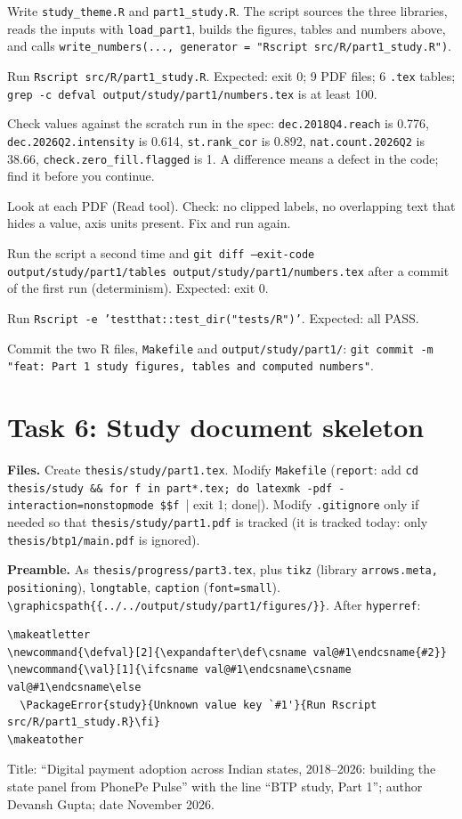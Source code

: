\documentclass[10pt,a4paper]{article}
\newcommand{\f}[1]{\texttt{#1}}
\begin{document}
\begin{steps}
\item Write \f{study\_theme.R} and \f{part1\_study.R}. The script sources the three libraries, reads the
      inputs with \f{load\_part1}, builds the figures, tables and numbers above, and calls
      \f{write\_numbers(..., generator = "Rscript src/R/part1\_study.R")}.
\item Run \f{Rscript src/R/part1\_study.R}. Expected: exit 0; 9 PDF files; 6 \f{.tex} tables;
      \f{grep -c defval output/study/part1/numbers.tex} is at least 100.
\item Check values against the scratch run in the spec: \f{dec.2018Q4.reach} is 0.776, \f{dec.2026Q2.intensity}
      is 0.614, \f{st.rank\_cor} is 0.892, \f{nat.count.2026Q2} is 38.66, \f{check.zero\_fill.flagged} is 1.
      A difference means a defect in the code; find it before you continue.
\item Look at each PDF (Read tool). Check: no clipped labels, no overlapping text that hides a value, axis units
      present. Fix and run again.
\item Run the script a second time and \f{git diff --exit-code output/study/part1/tables output/study/part1/numbers.tex}
      after a commit of the first run (determinism). Expected: exit 0.
\item Run \f{Rscript -e 'testthat::test\_dir("tests/R")'}. Expected: all PASS.
\item Commit the two R files, \f{Makefile} and \f{output/study/part1/}:
      \f{git commit -m "feat: Part 1 study figures, tables and computed numbers"}.
\end{steps}

\section{Task 6: Study document skeleton}
\textbf{Files.} Create \f{thesis/study/part1.tex}. Modify \f{Makefile} (\f{report}: add
\verb|cd thesis/study && for f in part*.tex; do latexmk -pdf -interaction=nonstopmode $$f || exit 1; done|).
Modify \f{.gitignore} only if needed so that \f{thesis/study/part1.pdf} is tracked (it is tracked today: only
\f{thesis/btp1/main.pdf} is ignored).

\textbf{Preamble.} As \f{thesis/progress/part3.tex}, plus \f{tikz} (library \f{arrows.meta, positioning}),
\f{longtable}, \f{caption} (\f{font=small}). \verb|\graphicspath{{../../output/study/part1/figures/}}|. After
\f{hyperref}:
\begin{verbatim}
\makeatletter
\newcommand{\defval}[2]{\expandafter\def\csname val@#1\endcsname{#2}}
\newcommand{\val}[1]{\ifcsname val@#1\endcsname\csname val@#1\endcsname\else
  \PackageError{study}{Unknown value key `#1'}{Run Rscript src/R/part1_study.R}\fi}
\makeatother

\end{verbatim}
Title: ``Digital payment adoption across Indian states, 2018--2026: building the state panel from PhonePe Pulse''
with the line ``BTP study, Part 1''; author Devansh Gupta; date November 2026.
\end{document}
